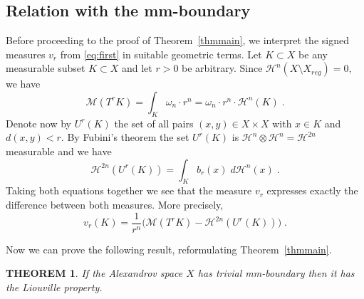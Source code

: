 \documentclass[12pt,leqno,intlimits]{amsart}
\numberwithin{equation}{section}
\newtheorem{thm}{THEOREM}[section]
\theoremstyle{definition}
\theoremstyle{remark}
\newcommand{\tref}[1]{Theorem~\ref{#1}}
\begin{document}
\subsection{Relation with the mm-boundary}
Before proceeding to the proof of  \tref{thmmain}, we interpret the signed measures $v_r$ from \eqref{eq:first} in suitable geometric terms.
Let $K\subset X$ be   any measurable  subset $K\subset X$ and let $r>0$ be arbitrary.
Since $\mathcal H^n (X\setminus X_{reg} )=0$, we have
$$\mathcal M (T^r K) =\int _K \omega _n \cdot r^n  =\omega _n \cdot r^n \cdot \mathcal H^n (K) \; .$$
Denote now by $U^r(K)$ the set of all pairs $(x,y)\in X\times X$ with $x\in K$ and $d(x,y)<r$.
By Fubini's theorem the set $U^r(K)$ is $\mathcal H^n \otimes \mathcal H^n =\mathcal H^{2n}$ measurable and we have
$$\mathcal H^{2n} (U^r (K))= \int _K b_r (x) \;  d\mathcal H^n (x) \;. $$
Taking both equations  together we see that the measure $v_r$ expresses exactly the difference between both measures. More precisely,
\begin{equation} \label{eq:compare}
v_r (K) = \frac 1 {r^n} \Big(\mathcal M (T^r K)- \mathcal H^{2n} (U^r (K)) \Big)\;.
\end{equation}



Now we can prove the following result,  reformulating \tref{thmmain}.
\begin{thm} \label{reform}
If the Alexandrov space $X$ has trivial mm-boundary then  it has the Liouville property.
\end{thm}
\end{document}
